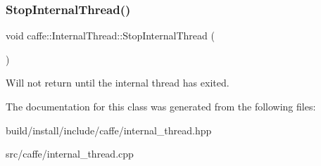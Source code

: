 \subsubsection{\texorpdfstring{Stop\+Internal\+Thread()}{StopInternalThread()}\hspace{0.1cm}{\footnotesize\ttfamily [2/2]}}
{\footnotesize\ttfamily void caffe\+::\+Internal\+Thread\+::\+Stop\+Internal\+Thread (\begin{DoxyParamCaption}{ }\end{DoxyParamCaption})}

Will not return until the internal thread has exited. 

The documentation for this class was generated from the following files\+:\begin{DoxyCompactItemize}
\item 
build/install/include/caffe/internal\+\_\+thread.\+hpp\item 
src/caffe/internal\+\_\+thread.\+cpp\end{DoxyCompactItemize}
